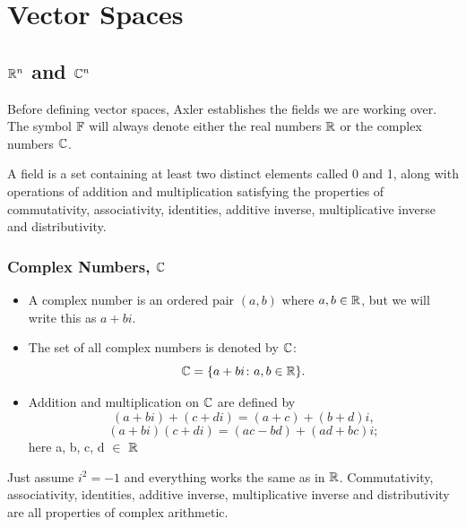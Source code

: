 \section{Vector Spaces}

\subsection{$\mathbb{R}^n$ and $\mathbb{C}^n$}

Before defining vector spaces, Axler establishes the fields we are working over. The symbol $\mathbb{F}$ will always denote either the real numbers $\mathbb{R}$ or the complex numbers $\mathbb{C}$.
\begin{definition}[Fields]
	A field is a set containing at least two distinct elements called 0 and 1, along with
	operations of addition and multiplication satisfying the properties of commutativity, associativity, identities, additive inverse, multiplicative inverse and distributivity.
\end{definition}
\subsubsection{Complex Numbers, $\mathbb{C}$}

\begin{definition}
\leavevmode
\begin{itemize}
	\item A complex number is an ordered pair $(a,b)$ where $a,b \in \mathbb{R}$, but we will write this as $a + bi$.
	\item The set of all complex numbers is denoted by $\mathbb{C}$:
	\[ \mathbb{C} = \{a + bi \colon a, b \in \mathbb{R}\}. \]
	\item Addition and multiplication on $\mathbb{C}$ are defined by
	\[ (a + bi) + (c + di) = (a + c) + (b + d)i, \]
	\[ (a + bi)(c + di) = (ac - bd) + (ad + bc)i; \]
	here a, b, c, d $\in$ $\mathbb{R}$
\end{itemize}
\end{definition}
\begin{tcolorbox}[colback=yellow!20, colframe=yellow!80!black, title=My thoughts]
Just assume $i^2 = -1$ and everything works the same as in $\mathbb{R}$. Commutativity, associativity, identities, additive inverse, multiplicative inverse and distributivity are all properties of complex arithmetic.
\end{tcolorbox}
